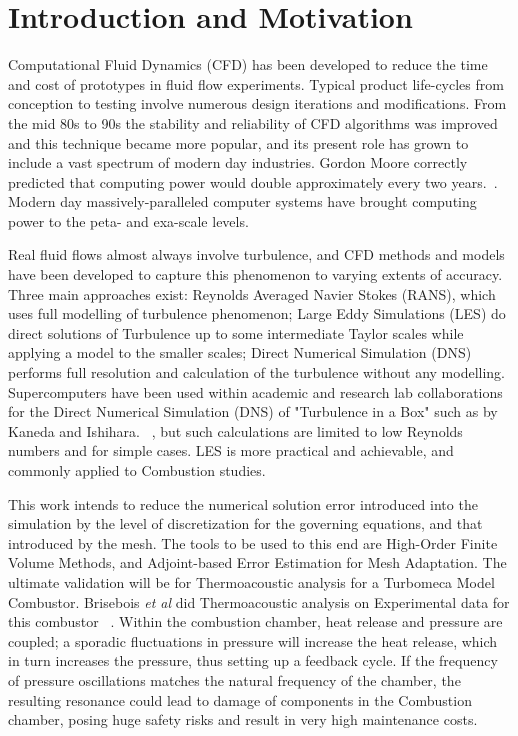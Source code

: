 \section{Introduction and Motivation}

Computational Fluid Dynamics (CFD) has been developed to reduce the time and cost of prototypes in fluid flow experiments. Typical product life-cycles from conception to testing involve numerous design iterations and modifications. From the mid 80s to 90s the stability and reliability of CFD algorithms was improved and this technique became more popular, and its present role has grown to include a vast spectrum of modern day industries. Gordon Moore correctly predicted that computing power would double approximately every two years.~\cite{intel:2005}. Modern day massively-paralleled computer systems have brought computing power to the peta- and exa-scale levels.\par

Real fluid flows almost always involve turbulence, and CFD methods and models have been developed to capture this phenomenon to varying extents of accuracy. Three main approaches exist: Reynolds Averaged Navier Stokes (RANS), which uses full modelling of turbulence phenomenon; Large Eddy Simulations (LES) do direct solutions of Turbulence up to some intermediate Taylor scales while applying a model to the smaller scales; Direct Numerical Simulation (DNS) performs full resolution and calculation of the turbulence without any modelling. Supercomputers have been used within academic and research lab collaborations for the Direct Numerical Simulation (DNS) of "Turbulence in a Box" such as by Kaneda and Ishihara. ~\cite{kaneda:2006}, but such calculations are limited to low Reynolds numbers and for simple cases. LES is more practical and achievable, and commonly applied to Combustion studies.\par 

This work intends to reduce the numerical solution error introduced into the simulation by the level of discretization for the governing equations, and that introduced by the mesh. The tools to be used to this end are High-Order Finite Volume Methods, and Adjoint-based Error Estimation for Mesh Adaptation. The ultimate validation will be for Thermoacoustic analysis  for a Turbomeca Model Combustor. Brisebois \textit{et al} did Thermoacoustic analysis on Experimental data for this combustor ~\cite{Brisebois:2014}. Within the combustion chamber, heat release and pressure are coupled; a sporadic fluctuations in pressure will increase the heat release, which in turn increases the pressure, thus setting up a feedback cycle. If the frequency of pressure oscillations matches the natural frequency of the chamber, the resulting resonance could lead to damage of components in the Combustion chamber, posing huge safety risks and result in very high maintenance costs.\par